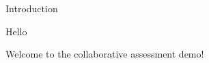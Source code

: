 
\begin{edXchapter}{Introduction}

%

\begin{edXtext}{Hello\!}

Welcome to the collaborative assessment demo!


\end{edXtext}
%
%

\end{edXchapter}
